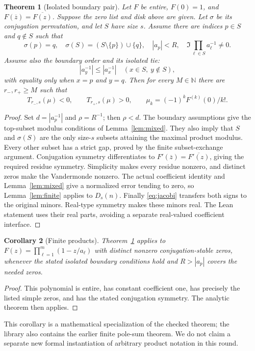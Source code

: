 \documentclass[11pt]{amsart}
\newtheorem{theorem}{Theorem}[section]
\newtheorem{corollary}[theorem]{Corollary}
\newcommand{\N}{\mathbb N}
\begin{document}
\begin{theorem}[Isolated boundary pair]\label{thm:entire}
Let $F$ be entire, $F(0)=1$, and
$F(\overline z)=\overline{F(z)}$. Suppose the zero list and disk above are given.
Let $\sigma$ be its conjugation permutation, and let $S$ have size $s$.
Assume there are indices $p\in S$ and $q\notin S$ such that
\[
 \sigma(p)=q,\quad
 \sigma(S)=(S\setminus\{p\})\cup\{q\},\quad
 |a_p|<R,\quad
 \Im\prod_{\ell\in S}a_\ell^{-1}\ne0.
\]
Assume also the boundary order and its isolated tie:
\[
 |a_y^{-1}|\le |a_x^{-1}|
       \quad(x\in S,\ y\notin S),
\]
with equality only when $x=p$ and $y=q$.
Then for every $M\in\N$ there are $r_-,r_+\ge M$ such that
\[
 T_{r_-,s}(\mu)<0,\qquad T_{r_+,s}(\mu)>0,
 \qquad \mu_k=(-1)^kF^{(k)}(0)/k!.
\]
\end{theorem}

\begin{proof}
Set $d=|a_p^{-1}|$ and $\rho=R^{-1}$; then $\rho<d$.
The boundary assumptions give the top-subset modulus conditions of Lemma~\ref{lem:mixed}. They also imply that $S$ and $\sigma(S)$ are the only size-$s$ subsets attaining the maximal product modulus. Every other subset has a strict gap, proved by the finite subset-exchange argument. Conjugation symmetry differentiates to
$F'(\overline z)=\overline{F'(z)}$, giving the required residue symmetry. Simplicity makes every residue nonzero, and distinct zeros make the Vandermonde nonzero.
The actual coefficient identity and Lemma~\ref{lem:mixed} give a normalized error tending to zero, so Lemma~\ref{lem:finite} applies to $D_s(n)$. Finally \eqref{eq:jacobi} transfers both signs to the original minors. Real-type symmetry makes these minors real. The Lean statement uses their real parts, avoiding a separate real-valued coefficient interface.
\end{proof}

\begin{corollary}[Finite products]
Theorem~\ref{thm:entire} applies to
$F(z)=\prod_{\ell=1}^m(1-z/a_\ell)$ with distinct nonzero conjugation-stable zeros, whenever the stated isolated boundary conditions hold and $R>|a_p|$ covers the needed zeros.
\end{corollary}
\begin{proof}
This polynomial is entire, has constant coefficient one, has precisely the listed simple zeros, and has the stated conjugation symmetry. The analytic theorem then applies.
\end{proof}
This corollary is a mathematical specialization of the checked theorem; the library also contains the earlier finite pole-sum theorem. We do not claim a separate new formal instantiation of arbitrary product notation in this round.
\end{document}

